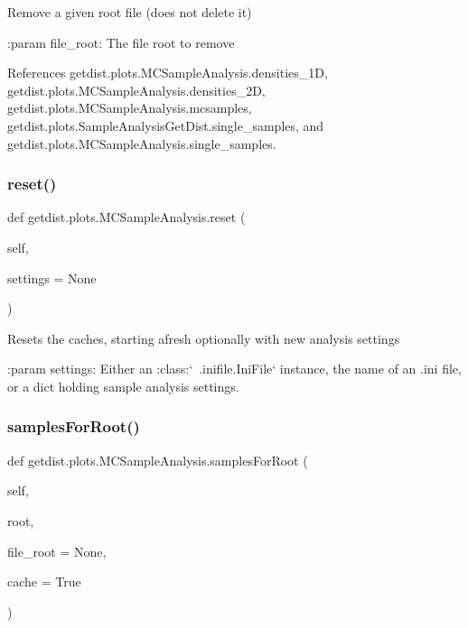 \begin{DoxyVerb}Remove a given root file (does not delete it)

:param file_root: The file root to remove
\end{DoxyVerb}
 

References getdist.\+plots.\+M\+C\+Sample\+Analysis.\+densities\+\_\+1D, getdist.\+plots.\+M\+C\+Sample\+Analysis.\+densities\+\_\+2D, getdist.\+plots.\+M\+C\+Sample\+Analysis.\+mcsamples, getdist.\+plots.\+Sample\+Analysis\+Get\+Dist.\+single\+\_\+samples, and getdist.\+plots.\+M\+C\+Sample\+Analysis.\+single\+\_\+samples.

\mbox{\label{classgetdist_1_1plots_1_1MCSampleAnalysis_aecba5996a9bd7571a2886360e9458cfe}} 
\subsubsection{\texorpdfstring{reset()}{reset()}}
{\footnotesize\ttfamily def getdist.\+plots.\+M\+C\+Sample\+Analysis.\+reset (\begin{DoxyParamCaption}\item[{}]{self,  }\item[{}]{settings = {\ttfamily None} }\end{DoxyParamCaption})}

\begin{DoxyVerb}Resets the caches, starting afresh optionally with new analysis settings

:param settings: Either an :class:`~.inifile.IniFile` instance,
       the name of an .ini file, or a dict holding sample analysis settings.
\end{DoxyVerb}
 \mbox{\label{classgetdist_1_1plots_1_1MCSampleAnalysis_a81c2af5210ee710151a4ea852312999c}} 
\subsubsection{\texorpdfstring{samples\+For\+Root()}{samplesForRoot()}}
{\footnotesize\ttfamily def getdist.\+plots.\+M\+C\+Sample\+Analysis.\+samples\+For\+Root (\begin{DoxyParamCaption}\item[{}]{self,  }\item[{}]{root,  }\item[{}]{file\+\_\+root = {\ttfamily None},  }\item[{}]{cache = {\ttfamily True} }\end{DoxyParamCaption})}

